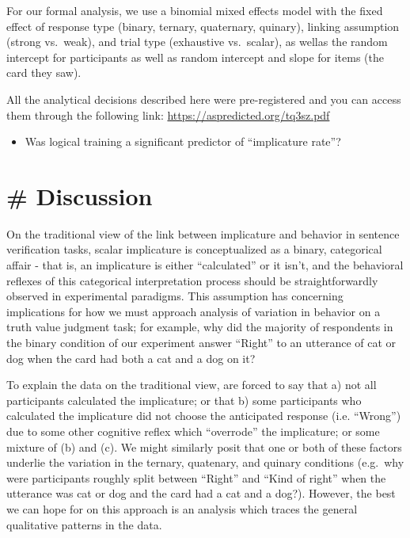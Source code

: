 \documentclass[floatsintext,man]{apa6}
\providecommand{\tightlist}{%
  \setlength{\itemsep}{0pt}\setlength{\parskip}{0pt}}
\theoremstyle{definition}
\theoremstyle{definition}
\theoremstyle{definition}
\theoremstyle{remark}
\begin{document}
For our formal analysis, we use a binomial mixed effects model with the
fixed effect of response type (binary, ternary, quaternary, quinary),
linking assumption (strong vs.~weak), and trial type (exhaustive
vs.~scalar), as wellas the random intercept for participants as well as
random intercept and slope for items (the card they saw).

All the analytical decisions described here were pre-registered and you
can access them through the following link:
\url{https://aspredicted.org/tq3sz.pdf}

\begin{itemize}
\tightlist
\item
  Was logical training a significant predictor of \enquote{implicature
  rate}?
\end{itemize}

\section{\# Discussion}\label{discussion}

On the traditional view of the link between implicature and behavior in
sentence verification tasks, scalar implicature is conceptualized as a
binary, categorical affair - that is, an implicature is either
\enquote{calculated} or it isn't, and the behavioral reflexes of this
categorical interpretation process should be straightforwardly observed
in experimental paradigms. This assumption has concerning implications
for how we must approach analysis of variation in behavior on a truth
value judgment task; for example, why did the majority of respondents in
the binary condition of our experiment answer \enquote{Right} to an
utterance of cat or dog when the card had both a cat and a dog on it?

To explain the data on the traditional view, are forced to say that a)
not all participants calculated the implicature; or that b) some
participants who calculated the implicature did not choose the
anticipated response (i.e. \enquote{Wrong}) due to some other cognitive
reflex which \enquote{overrode} the implicature; or some mixture of (b)
and (c). We might similarly posit that one or both of these factors
underlie the variation in the ternary, quatenary, and quinary conditions
(e.g.~why were participants roughly split between \enquote{Right} and
\enquote{Kind of right} when the utterance was cat or dog and the card
had a cat and a dog?). However, the best we can hope for on this
approach is an analysis which traces the general qualitative patterns in
the data.
\end{document}
